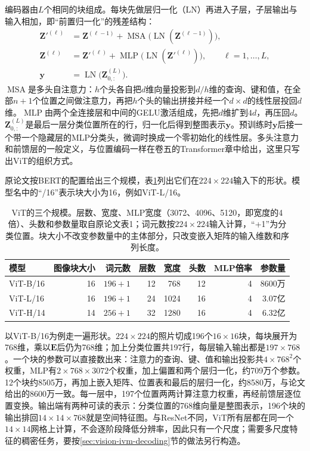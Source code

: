 编码器由$L$个相同的块组成。每块先做层归一化（LN）再进入子层，子层输出与输入相加，即“前置归一化”的残差结构：
\begin{equation}
  \begin{aligned}
    \bm Z'^{(\ell)}&=\bm Z^{(\ell-1)}+\operatorname{MSA}\bigl(\operatorname{LN}(\bm Z^{(\ell-1)})\bigr),\\
    \bm Z^{(\ell)}&=\bm Z'^{(\ell)}+\operatorname{MLP}\bigl(\operatorname{LN}(\bm Z'^{(\ell)})\bigr),
    \qquad \ell=1,\ldots,L,\\
    \bm y&=\operatorname{LN}\bigl(\bm Z^{(L)}_{0,:}\bigr).
  \end{aligned}
  \label{eq:vision-ivm-vit-block}
\end{equation}
$\operatorname{MSA}$是多头自注意力：$h$个头各自把$d$维向量投影到$d/h$维的查询、键和值，在全部$n+1$个位置之间做注意力，再把$h$个头的输出拼接并经一个$d\times d$的线性层投回$d$维。$\operatorname{MLP}$由两个全连接层和中间的GELU激活组成，先把$d$维扩到$4d$，再压回$d$。$\bm Z^{(L)}_{0,:}$是最后一层分类位置所在的行，归一化后得到整图表示$\bm y$。预训练时$\bm y$后接一个带一个隐藏层的MLP分类头，微调时换成一个零初始化的线性层。多头注意力和前馈层的一般定义，与位置编码一样在卷五的Transformer章中给出，这里只写出ViT的组织方式。

原论文按BERT的配置给出三个规模，表\ref{tab:vision-ivm-vit-configs}列出它们在$224\times224$输入下的形状。模型名中的“/16”表示块大小为16，例如ViT-L/16。

\begin{table}[tbp]
  \centering
  \small
  \begin{tabular}{@{}lrrrrrrr@{}}
    \toprule
    模型 & 图像块大小 & 词元数 & 层数 & 宽度 & 头数 & MLP倍率 & 参数量\\
    \midrule
    ViT-B/16 & 16 & $196+1$ & 12 & 768 & 12 & 4 & 8600万\\
    ViT-L/16 & 16 & $196+1$ & 24 & 1024 & 16 & 4 & 3.07亿\\
    ViT-H/14 & 14 & $256+1$ & 32 & 1280 & 16 & 4 & 6.32亿\\
    \bottomrule
  \end{tabular}
  \caption{ViT的三个规模。层数、宽度、MLP宽度（3072、4096、5120，即宽度的4倍）、头数和参数量取自原论文表1；词元数按$224\times224$输入计算，“+1”为分类位置。块大小不改变参数量中的主体部分，只改变嵌入矩阵的输入维数和序列长度。}
  \label{tab:vision-ivm-vit-configs}
\end{table}

以ViT-B/16为例走一遍形状。$224\times224$的照片切成196个$16\times16$块，每块展开为768维，乘以$\bm E$后仍为768维；加上分类位置共197行，每层输入输出都是$197\times768$。一个块的参数可以直接数出来：注意力的查询、键、值和输出投影共$4\times768^2$个权重，MLP有$2\times768\times3072$个权重，加上偏置和两个层归一化，约709万个参数。12个块约8505万，再加上嵌入矩阵、位置表和最后的层归一化，约8580万，与论文给出的8600万一致。每一层中，197个位置两两计算注意力权重，再经前馈层逐位置变换。输出端有两种可读的表示：分类位置的768维向量是整图表示，196个块的输出排回$14\times14\times768$就是空间特征图。与ResNet不同，ViT所有层都在同一个$14\times14$网格上计算，不会逐阶段降低分辨率，因此只有一个尺度；需要多尺度特征的稠密任务，要按\ref{sec:vision-ivm-decoding}节的做法另行构造。

